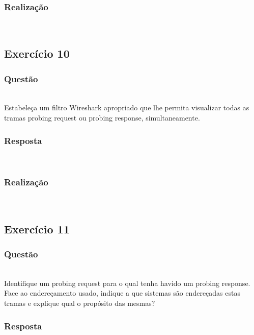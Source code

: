 \documentclass{llncs}
\begin{document}
\subsubsection{Realização}\rule[-10pt]{0pt}{10pt}\\



\clearpage
\subsection{Exercício 10}
\subsubsection{Questão}\rule[-10pt]{0pt}{10pt}\\

Estabeleça um filtro Wireshark apropriado que lhe permita visualizar todas as tramas probing request ou probing response, simultaneamente.

\subsubsection{Resposta}\rule[-10pt]{0pt}{10pt}\\



\subsubsection{Realização}\rule[-10pt]{0pt}{10pt}\\




\clearpage
\subsection{Exercício 11}
\subsubsection{Questão}\rule[-10pt]{0pt}{10pt}\\

Identifique um probing request para o qual tenha havido um probing response. Face ao endereçamento usado, indique a que sistemas são endereçadas estas tramas e explique qual o propósito das mesmas?

\subsubsection{Resposta}\rule[-10pt]{0pt}{10pt}\\
\end{document}
